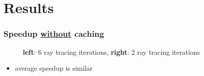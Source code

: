\documentclass{beamer}
\begin{document}
\section{Results}
\begin{frame}
  \frametitle{Speedup \underline{without} caching}
  \begin{figure}
    \centering
      \caption{\textbf{left}: 6 ray tracing iterations, \textbf{right}: 2 ray tracing iterations}
  \end{figure}
  
  \begin{itemize}
    \item average speedup is similar
  \end{itemize}
\end{frame}
\end{document}
